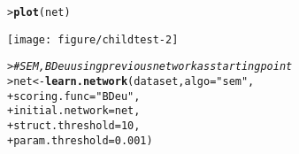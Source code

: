 \documentclass{article}\usepackage[]{graphicx}\usepackage[]{color}
\makeatletter
\def\maxwidth{ %
  \ifdim\Gin@nat@width>\linewidth
    \linewidth
  \else
    \Gin@nat@width
  \fi
}
\newcommand{\hlnum}[1]{\textcolor[rgb]{0.686,0.059,0.569}{#1}}%
\newcommand{\hlstr}[1]{\textcolor[rgb]{0.192,0.494,0.8}{#1}}%
\newcommand{\hlcom}[1]{\textcolor[rgb]{0.678,0.584,0.686}{\textit{#1}}}%
\newcommand{\hlstd}[1]{\textcolor[rgb]{0.345,0.345,0.345}{#1}}%
\newcommand{\hlkwb}[1]{\textcolor[rgb]{0.69,0.353,0.396}{#1}}%
\newcommand{\hlkwc}[1]{\textcolor[rgb]{0.333,0.667,0.333}{#1}}%
\newcommand{\hlkwd}[1]{\textcolor[rgb]{0.737,0.353,0.396}{\textbf{#1}}}%
\newenvironment{kframe}{%
 \def\at@end@of@kframe{}%
 \ifinner\ifhmode%
  \def\at@end@of@kframe{\end{minipage}}%
  \begin{minipage}{\columnwidth}%
 \fi\fi%
 \def\FrameCommand##1{\hskip\@totalleftmargin \hskip-\fboxsep
 \colorbox{shadecolor}{##1}\hskip-\fboxsep
     \hskip-\linewidth \hskip-\@totalleftmargin \hskip\columnwidth}%
 \MakeFramed {\advance\hsize-\width
   \@totalleftmargin\z@ \linewidth\hsize
   \@setminipage}}%
 {\par\unskip\endMakeFramed%
 \at@end@of@kframe}
\newenvironment{knitrout}{}{} %
\makeatother
\begin{document}
\begin{knitrout}
\begin{kframe}
{\ttfamily\noindent\itshape\color{messagecolor}{bnstruct :: learning the structure using MMHC ...\\bnstruct :: learning using MMHC completed.\\bnstruct :: learning network parameters ... \\bnstruct :: parameter learning done.}}\begin{alltt}
\hlstd{> }\hlkwd{plot}\hlstd{(net)}
\end{alltt}
\end{kframe}
\texttt{[image: figure/childtest-2]} 
\begin{kframe}\begin{alltt}
\hlstd{> }\hlcom{# SEM, BDeu using previous network as starting point}
\hlstd{> }\hlstd{net} \hlkwb{<-} \hlkwd{learn.network}\hlstd{(dataset,} \hlkwc{algo} \hlstd{=} \hlstr{"sem"}\hlstd{,}
\hlstd{+ }                     \hlkwc{scoring.func} \hlstd{=} \hlstr{"BDeu"}\hlstd{,}
\hlstd{+ }                     \hlkwc{initial.network} \hlstd{= net,}
\hlstd{+ }                     \hlkwc{struct.threshold} \hlstd{=} \hlnum{10}\hlstd{,}
\hlstd{+ }                     \hlkwc{param.threshold} \hlstd{=} \hlnum{0.001}\hlstd{)}
\end{alltt}



\end{kframe}
\end{knitrout}
\end{document}
